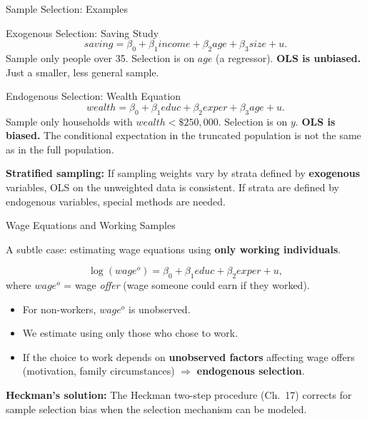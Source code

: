\documentclass[aspectratio=169, 12pt]{beamer}
\begin{document}
\begin{frame}[shrink=25]{Sample Selection: Examples}

  \begin{examplebox}{Exogenous Selection: Saving Study}
    \[
      saving = \beta_0 + \beta_1 \mathit{income} + \beta_2 \mathit{age} + \beta_3 \mathit{size} + u.
    \]
    Sample only people over 35. Selection is on $\mathit{age}$ (a regressor). \textbf{OLS is
    unbiased.} Just a smaller, less general sample.
  \end{examplebox}

  \begin{examplebox}{Endogenous Selection: Wealth Equation}
    \[
      wealth = \beta_0 + \beta_1 \mathit{educ} + \beta_2 \mathit{exper} + \beta_3 \mathit{age} + u.
    \]
    Sample only households with $wealth < \$250{,}000$. Selection is on $y$. \textbf{OLS is
    biased.} The conditional expectation in the truncated population is not the same as in
    the full population.
  \end{examplebox}

  \begin{keybox}
    \textbf{Stratified sampling:} If sampling weights vary by strata defined by
    \textbf{exogenous} variables, OLS on the unweighted data is consistent.
    If strata are defined by endogenous variables, special methods are needed.
  \end{keybox}

\end{frame}

\begin{frame}{Wage Equations and Working Samples}

  A subtle case: estimating wage equations using \textbf{only working individuals}.

  \[
    \log(wage^o) = \beta_0 + \beta_1 \mathit{educ} + \beta_2 \mathit{exper} + u, \tag{9.39}
  \]
  where $wage^o$ = wage \emph{offer} (wage someone could earn if they worked).

  \begin{itemize}\setlength{\itemsep}{1pt}
    \item For non-workers, $wage^o$ is unobserved.
    \item We estimate using only those who chose to work.
    \item If the choice to work depends on \textbf{unobserved factors} affecting wage offers
    (motivation, family circumstances) $\Rightarrow$ \textbf{endogenous selection}.
  \end{itemize}

  \begin{highlightbox}
    \textbf{Heckman's solution:} The Heckman two-step procedure (Ch.~17) corrects for sample
    selection bias when the selection mechanism can be modeled.
  \end{highlightbox}

\end{frame}
\end{document}
